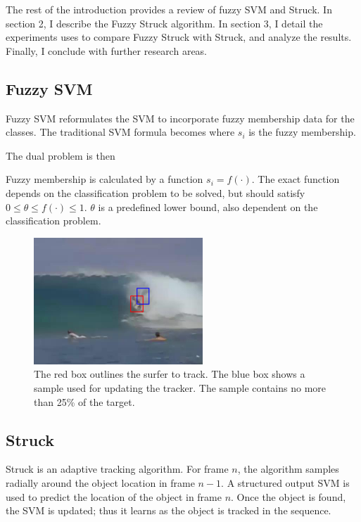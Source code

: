 \documentclass{IEEEtran}
\begin{document}
The rest of the introduction provides a review of fuzzy SVM and Struck. In section 2, I describe the
Fuzzy Struck algorithm. In section 3, I detail the experiments uses to compare Fuzzy Struck with
Struck, and analyze the results. Finally, I conclude with further research areas.

\subsection{Fuzzy SVM} %
Fuzzy SVM \cite{991432} reformulates the SVM to incorporate fuzzy membership data for the classes. The
traditional SVM formula
\svmEquation
becomes
\fuzzySvmEquation
where \(s_i\) is the fuzzy membership.

The dual problem is then
\fuzzyDual

Fuzzy membership is calculated by a function \(s_i = f(\cdot)\). The exact function depends on the
classification problem to be solved, but should satisfy \(0 \le \theta \le f(\cdot) \le 1\).
\(\theta\) is a predefined lower bound, also dependent on the classification problem.

\begin{figure}
    \centering
    \includegraphics[width=2.5in]{surfer_sample}
    \caption{The red box outlines the surfer to track. The blue box shows a sample used for updating
    the tracker. The sample contains no more than 25\% of the target.}
    \label{fig:surfer}
\end{figure}

\subsection{Struck} %
Struck \cite{6126251} is an adaptive tracking algorithm. For frame \(n\), the algorithm samples
radially around the object location in frame \(n-1\). A structured output SVM is used to predict the
location of the object in frame \(n\). Once the object is found, the SVM is updated; thus it learns as
the object is tracked in the sequence.
\end{document}
